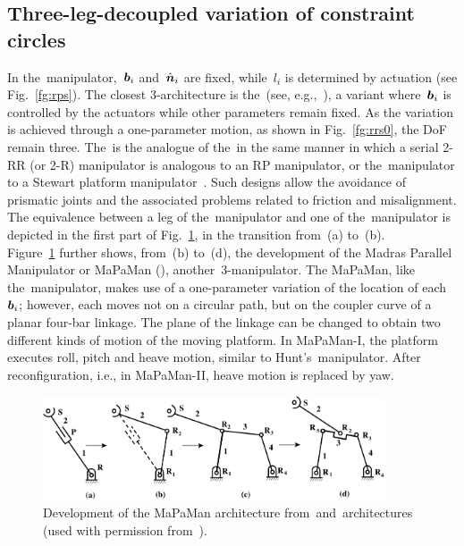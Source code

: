 \documentclass[DD]{iitmdiss}
\newcommand{\mref}[1]{\ref{#1}}
\newcommand{\mcite}[1]{\cite{#1}}
\newcommand{\mlabel}[1]{\label{#1}}
\begin{document}
\subsection{Three-\dofs leg-decoupled variation of constraint circles} \mlabel{sc:3decoupled}
%
In the~\rps manipulator,~$\bm{b}_i$ and~$\hat{\bm{n}}_i$ are fixed, while~$l_i$ is determined by actuation (see Fig.~\mref{fg:rps}). The closest 3-\dofs architecture is the~\rrs (see, e.g.,~\mcite{rohit15}), a variant where~$\bm{b}_i$ is controlled by the actuators while other parameters remain fixed. As the variation is achieved through a one-parameter motion, as shown in Fig.~\mref{fg:rrs0}, the DoF remain three. The~\rrs is the analogue of the~\rps in the same manner in which a serial 2-\dofs RR (or 2-R) manipulator is analogous to an RP manipulator, or the~\rss manipulator to a Stewart platform manipulator~\mcite{nag2019}. Such designs allow the avoidance of prismatic joints and the associated problems related to friction and misalignment. The equivalence between a leg of the~\rrs manipulator and one of the~\rps manipulator is depicted in the first part of Fig.~\mref{fg:evolution}, in the transition from~(a) to~(b).\\
Figure~\mref{fg:evolution} further shows, from~(b) to~(d), the development of the Madras Parallel Manipulator or MaPaMan (\mcite{arsb2012a}), another~3-\dofs manipulator. The MaPaMan, like the~\rrs manipulator, makes use of a one-parameter variation of the location of each~$\bm{b}_i$; however, each moves not on a circular path, but on the coupler curve of a planar four-bar linkage. The plane of the linkage can be changed to obtain two different kinds of motion of the moving platform. In MaPaMan-I, the platform executes roll, pitch and heave motion, similar to Hunt's~\rps manipulator. After reconfiguration, i.e., in MaPaMan-II, heave motion is replaced by yaw. 
%
\begin{figure}[h]	
	\centering
	\includegraphics[width=0.9\textwidth]{evolution.pdf}
	\caption{Development of the MaPaMan architecture from~\rps and~\rrs architectures (used with permission from~\mcite{arsb2012a}).}
	\mlabel{fg:evolution}
\end{figure}
%
\end{document}
